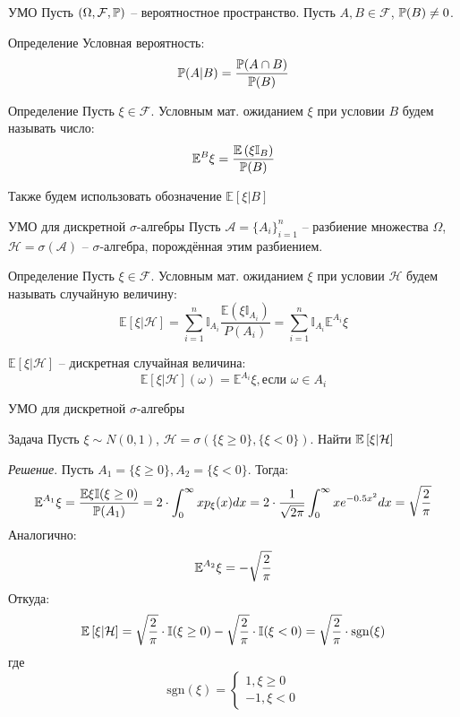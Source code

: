 \documentclass{beamer}
\begin{document}
\begin{frame}{УМО}
    Пусть $\left( \Omega, \mathcal{F} , \mathbb{P}\right)$ -- вероятностное пространство. Пусть $A, B \in \mathcal{F} $, $\mathbb{P}(B) \neq 0$. 
    \begin{block}{Определение}
        Условная вероятность: 
        $$
            \mathbb{P}(A|B) = \dfrac{\mathbb{P}(A\cap B)}{\mathbb{P}(B)}
        $$
    \end{block}

    \begin{block}{Определение}
        Пусть $\xi \in \mathcal{F}$. Условным мат. ожиданием $\xi$ при условии $B$ будем называть число:
        $$\mathbb{E}^B \xi = \dfrac{\mathbb{E} \left(\xi \mathbb{I}_{B}\right)}{\mathbb{P}(B)}$$
    \end{block}
    Также будем использовать обозначение $\mathbb{E}\left[ \xi | B \right]$
\end{frame}

\begin{frame}{УМО для дискретной $\sigma$-алгебры}
    Пусть $\mathcal{A} = \{A_i\}_{i=1}^n$ -- разбиение множества $\Omega$, $\mathcal{H} = \sigma(\mathcal{A})$ -- $\sigma$-алгебра, порождённая этим разбиением.

    \begin{block}{Определение}
        Пусть $\xi \in \mathcal{F}$. Условным мат. ожиданием $\xi$ при условии $\mathcal{H}$ будем называть случайную величину:
        $$\mathbb{E}\left[ \xi | \mathcal{H} \right] = \sum_{i=1}^n \mathbb{I}_{A_i} \dfrac{\mathbb{E} \left(\xi \mathbb{I}_{A_i}\right)}{P(A_i)} = 
        \sum_{i=1}^n \mathbb{I}_{A_i} \mathbb{E}^{A_i}\xi$$
    \end{block}

    $\mathbb{E}\left[ \xi | \mathcal{H} \right]$ -- дискретная случайная величина:
    $$
        \mathbb{E}\left[ \xi | \mathcal{H} \right](\omega) = \mathbb{E}^{A_i} \xi, \text{если } \omega \in A_i
    $$
\end{frame}

\begin{frame}{УМО для дискретной $\sigma$-алгебры}
    \begin{block}{Задача}
        Пусть $\xi \sim N(0, 1)$, $\mathcal{H} = \sigma\left( \{\xi \geq 0\}, \{\xi < 0\} \right)$. Найти $\mathbb{E} \left[ \xi | \mathcal{H} \right]$
    \end{block}
    \textit{Решение}. Пусть $A_1 = \{\xi \geq 0\}, A_2 = \{\xi < 0\}$. Тогда:
    $$
        \mathbb{E}^{A_1} \xi = \dfrac{\mathbb{E} \xi \mathbb{I} (\xi \geq 0)}{\mathbb{P}(A_1)} = 2 \cdot \int_0^{\infty} x p_{\xi}(x) dx = 2 \cdot \dfrac{1}{\sqrt{2\pi}} \int_0^{\infty} x e^{-0.5x^2} dx
        = \sqrt{\dfrac{2}{\pi}}
    $$
    Аналогично:
    $$
        \mathbb{E}^{A_2} \xi = -\sqrt{\dfrac{2}{\pi}}
    $$
    Откуда:
    $$
        \mathbb{E} \left[ \xi | \mathcal{H} \right] = \sqrt{\dfrac{2}{\pi}} \cdot \mathbb{I}(\xi \geq 0) -\sqrt{\dfrac{2}{\pi}} \cdot \mathbb{I}(\xi < 0)
        = \sqrt{\dfrac{2}{\pi}} \cdot \mathrm{sgn}(\xi)
    $$где
    $$
        \mathrm{sgn}(\xi) = \begin{cases}
            1, \xi \geq 0 \\
            -1, \xi < 0
        \end{cases}
    $$
\end{frame}
\end{document}
